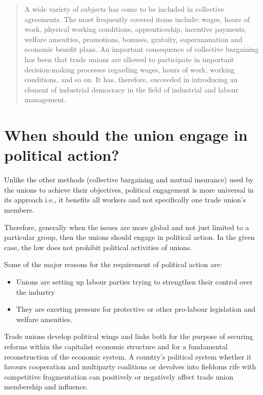 \begin{enumerate}
  \begin{quote}
  A wide variety of subjects has come to be included in collective
  agreements. The most frequently covered items include: wages, hours of
  work, physical working conditions, apprenticeship, incentive payments,
  welfare amenities, promotions, bonuses, gratuity, superannuation and
  economic benefit plans. An important consequence of collective
  bargaining has been that trade unions are allowed to participate in
  important decision-making processes regarding wages, hours of work,
  working conditions, and so on. It has, therefore, succeeded in
  introducing an element of industrial democracy in the field of
  industrial and labour management.
  \end{quote}
\end{enumerate}




\section{When should the union engage in political action?}


Unlike the other methods (collective bargaining and mutual insurance)
used by the unions to achieve their objectives, political engagement is
more universal in its approach i.e., it benefits all workers and not
specifically one trade union's members.

Therefore, generally when the issues are more global and not just
limited to a particular group, then the unions should engage in
political action. In the given case, the law does not prohibit political
activities of unions.

Some of the major reasons for the requirement of political action are:

\begin{itemize}
\item
  Unions are setting up labour parties trying to strengthen their
  control over the industry
\item
  They are exerting pressure for protective or other pro-labour
  legislation and welfare amenities.
\end{itemize}

Trade unions develop political wings and links both for the purpose of
securing reforms within the capitalist economic structure and for a
fundamental reconstruction of the economic system. A country's political
system whether it favours cooperation and multiparty coalitions or
devolves into fiefdoms rife with competitive fragmentation can
positively or negatively affect trade union membership and influence.

